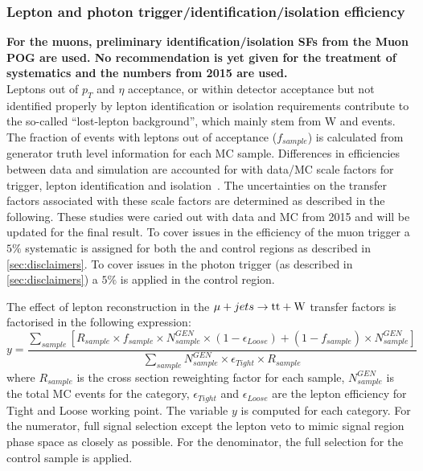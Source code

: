 \subsubsection*{Lepton and photon trigger/identification/isolation efficiency}
\label{sec:tfSyst_lepton}
\textbf{For the muons, preliminary identification/isolation SFs from the Muon POG are used. 
No recommendation is yet given for the treatment of systematics and the numbers from 2015 are used. }\\
Leptons out of $p_{T}$ and $\eta$ acceptance, or within detector
acceptance but not identified properly by lepton identification or isolation
requirements contribute to the so-called ``lost-lepton background'', 
which mainly stem from W and \ttbar events. 
The fraction of events with leptons out of acceptance ($f_{sample}$)
is calculated from generator truth level information for each MC
sample. Differences in efficiencies between data and simulation are
accounted for with data/MC scale
factors for trigger, lepton identification and isolation~\cite{twiki-leptonSF}. 
The uncertainties on the transfer factors associated 
with these scale factors are determined as described in the following.
These studies were caried out with data and MC from 2015 and will be updated 
for the final result. To cover issues in the efficiency of the
muon trigger a $5\%$ systematic is assigned for both the \mj and \mmj 
control regions as described in \ref{sec:disclaimers}. To cover 
issues in the photon trigger (as described in \ref{sec:disclaimers}) a $5\%$ is applied in the
\gj control region.

The effect of lepton reconstruction in the $\mu + jets \rightarrow \mathrm{tt+W}$ 
transfer factors is factorised in the following expression: 
\begin{equation}
    \label{eq:lostLepTF}
    y = \frac{\sum_{sample} [ R_{sample} \times f_{sample} \times N^{GEN}_{sample} \times ( 1 - \epsilon_{Loose} ) + ( 1 - f_{sample} ) \times N^{GEN}_{sample} ]}{ \sum_{sample} N^{GEN}_{sample} \times \epsilon_{Tight} \times R_{sample} }
\end{equation}
where $R_{sample}$ is the cross section reweighting factor for each sample, 
$N^{GEN}_{sample}$ is the total MC events for the category, $\epsilon_{Tight}$
and $\epsilon_{Loose}$ are the lepton efficiency for Tight and Loose working 
point. The variable $y$ is computed for each category. For the numerator, full
signal selection except the lepton veto to mimic signal region phase space as
closely as possible. For the denominator, the full selection for the \mj 
control sample is applied.

